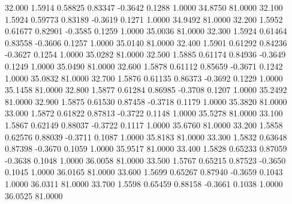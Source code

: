   32.000   1.5914   0.58825   0.83347  -0.3642   0.1288   1.0000  34.8750  81.0000
  32.100   1.5924   0.59773   0.83189  -0.3619   0.1271   1.0000  34.9492  81.0000
  32.200   1.5952   0.61677   0.82901  -0.3585   0.1259   1.0000  35.0036  81.0000
  32.300   1.5924   0.61464   0.83558  -0.3606   0.1257   1.0000  35.0140  81.0000
  32.400   1.5901   0.61292   0.84236  -0.3627   0.1254   1.0000  35.0282  81.0000
  32.500   1.5885   0.61174   0.84936  -0.3649   0.1249   1.0000  35.0490  81.0000
  32.600   1.5878   0.61112   0.85659  -0.3671   0.1242   1.0000  35.0832  81.0000
  32.700   1.5876   0.61135   0.86373  -0.3692   0.1229   1.0000  35.1458  81.0000
  32.800   1.5877   0.61284   0.86985  -0.3708   0.1207   1.0000  35.2492  81.0000
  32.900   1.5875   0.61530   0.87458  -0.3718   0.1179   1.0000  35.3820  81.0000
  33.000   1.5872   0.61822   0.87813  -0.3722   0.1148   1.0000  35.5278  81.0000
  33.100   1.5867   0.62149   0.88037  -0.3722   0.1117   1.0000  35.6760  81.0000
  33.200   1.5858   0.62576   0.88039  -0.3711   0.1087   1.0000  35.8183  81.0000
  33.300   1.5832   0.63648   0.87398  -0.3670   0.1059   1.0000  35.9517  81.0000
  33.400   1.5828   0.65233   0.87059  -0.3638   0.1048   1.0000  36.0058  81.0000
  33.500   1.5767   0.65215   0.87523  -0.3650   0.1045   1.0000  36.0165  81.0000
  33.600   1.5699   0.65267   0.87940  -0.3659   0.1043   1.0000  36.0311  81.0000
  33.700   1.5598   0.65459   0.88158  -0.3661   0.1038   1.0000  36.0525  81.0000
